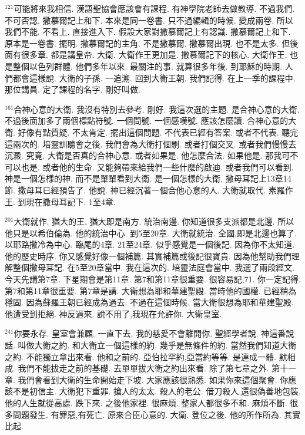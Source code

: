 \documentclass{book}
\begin{document}
$^{121}$可能將來我相信.
漢語聖協會應該會有課程.
有神學院老師去做教導.
不過我們.
不可否認.
撒慕爾記上和下.
本來是同一卷書.
只不過編輯的時候.
變成兩卷.
所以我們不能.
不看上.
直接進入下.
假設大家對撒慕爾記上有認識.
撒慕爾記上和下.
原本是一卷書.
擺明.
撒慕爾記的主角.
不是撒慕爾.
撒慕爾出現.
也不是太多.
但後面有很多章.
都是講皇帝.
大衛.
大衛作王更加是.
撒慕爾記下的核心.
大衛作王.
也是整個以色列群體.
他們多年以來.
最關注的事.
就算很多年後.
到耶穌的時期.
人們都會這樣說.
大衛的子孫.
一追溯.
回到大衛王朝.
我們記得.
在上一季的課程中.
那位講員.
定了課程的名字.
剛好叫做.

$^{161}$合神心意的大衛.
我沒有特別去參考.
剛好.
我這次選的主題.
是合神心意的大衛.
不過後面加多了兩個標點符號.
一個問號.
一個感嘆號.
應該怎麼讀.
合神心意的大衛.
好像有點質疑.
不太肯定.
擺出這個問題.
不代表已經有答案.
或者不代表.
聽完這兩次的.
培靈訓聽會之後.
我們會為大衛打個剔.
或者打個交叉.
或者我們慢慢去沉澱.
究竟.
大衛是否真的合神心意.
或者如果是.
他怎麼合法.
如果他是.
那我可不可以也是.
或者他的生命.
又能夠帶來給我們一些什麼的啟迪.
或者我們可以看到.
神是一個怎樣的神.
而不是單單看到大衛.
是一個怎樣的大衛.
撒母耳記上13章14節.
撒母耳已經預告了.
他說.
神已經沉著一個合他心意的人.
大衛就取代.
素羅作王.
到現在撒母耳記下.
1至4章.

$^{201}$大衛就作.
猶大的王.
猶大即是南方.
統治南邊.
你知道很多支派都是北邊.
所以他只是以希伯倫為.
他的統治中心.
到5至20章.
大衛就統治.
全國,即是北邊也算了.
以耶路撒冷為中心.
臨尾的4章.
21至24章.
似乎感覺是一個後記.
因為你不太知道.
他的歷史時序.
你又感覺好像一個補篇.
其實補篇或後記很寶貴.
因為他幫助我們理解整個撒母耳記.
在5至20章當中.
我在這次的.
培靈法庭會當中.
我選了兩段經文.
今天先講第7章.
下星期會是第11章.
第7和第11章很重要.
很容易記,71.
你一定記得.
第7和第11章很重要.
第7章是講.
大衛想為耶和華建聖殿.
當時他的國權.
已經稍為穩固.
因為蘇羅王朝已經成為過去.
不過在這個時候.
當大衛很想為耶和華建聖殿.
他遭受到拒絕.
神反過來.
說不用了,我現在允許你.
大衛皇室.

$^{241}$你要永存.
皇室會兼顧.
一直下去.
我的慈愛不會離開你.
聖經學者說.
神這番說話.
叫做大衛之約.
和大衛立一個這樣的約.
幾乎是無條件的約.
當然我們知道大衛之約.
不能獨立拿出來看.
他和之前的.
亞伯拉罕約,亞當約等等.
是連成一體.
默相成.
我們不能拔走之前的基礎.
去單單拔大衛之約出來看.
除了第七章之外.
第十一章.
我們會看到大衛的生命開始走下坡.
大家應該很熟悉.
如果你來這個聚會.
你應該不是初信主.
大衛犯下重罪.
搶人的太太.
殺人的老公.
借刀殺人,還很偽善地包裝.
他的人生就從高處.
跌下來.
之後他家裡.
很麻煩.
整家人都很多不和.
麻煩不斷.
很多問題發生.
有罪惡,有死亡.
原來合臣心意的.
大衛.
登位之後.
他的所作所為.
其實比起.
\end{document}
